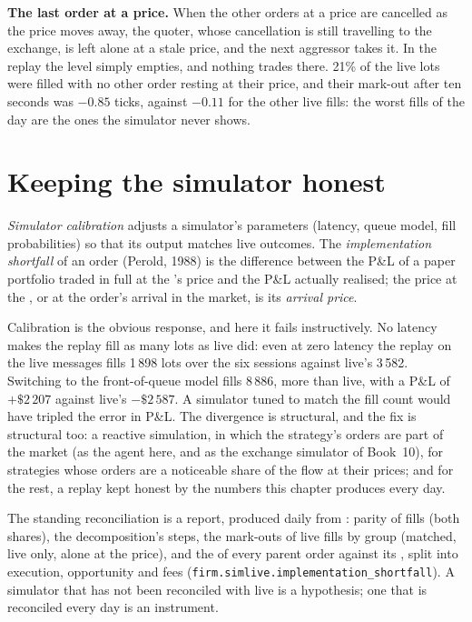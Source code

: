 \textbf{The last order at a price.} When the other orders at a price are cancelled as the price moves away, the quoter, whose cancellation is still travelling to the
exchange, is left alone at a stale price, and the next aggressor takes it. In the replay the level simply empties, and nothing trades there. 21\% of the live lots were
filled with no other order resting at their price, and their mark-out after ten seconds was $-0.85$ ticks, against $-0.11$ for the other live fills: the worst fills
of the day are the ones the simulator never shows.

\section{Keeping the simulator honest}

\begin{definition}\label{def:rs:simulation-versus-live:calibration}
\emph{Simulator calibration} adjusts a simulator's parameters (latency, queue model, fill probabilities) so that its output matches live
outcomes. The \emph{implementation shortfall} of an order (Perold, 1988) is the difference between the P\&L of a paper portfolio traded
in full at the 's price and the P\&L actually realised; the price at the , or at the order's arrival in the market, is its \emph{arrival
price}.
\end{definition}

Calibration is the obvious response, and here it fails instructively. No latency makes the replay fill as many lots as live did: even at zero latency the replay on the
live messages fills 1\,898 lots over the six sessions against live's 3\,582. Switching to the front-of-queue model fills 8\,886, more than live, with a P\&L of $+\$2\,207$
against live's $-\$2\,587$. A simulator tuned to match the fill count would have tripled the error in P\&L. The divergence is structural, and the fix is structural too: a
reactive simulation, in which the strategy's orders are part of the market (as the agent here, and as the exchange simulator of Book~10), for strategies whose orders
are a noticeable share of the flow at their prices; and for the rest, a replay kept honest by the numbers this chapter produces every day.

The standing reconciliation is a report, produced daily from : parity of fills (both shares), the decomposition's steps, the mark-outs of live fills by
group (matched, live only, alone at the price), and the  of every parent order against its , split into execution, opportunity and
fees (\texttt{firm.simlive.implementation\_shortfall}). A simulator that has not been reconciled with live is a hypothesis; one that is reconciled every day is an
instrument.

